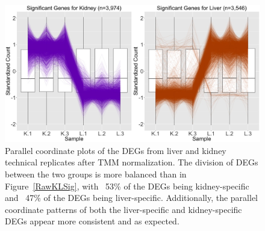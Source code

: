 \documentclass{article}
\begin{document}
\clearpage
\null
\begin{figure}[t!]
\centerline{\includegraphics[width=1\columnwidth]{../Bioinformatics/Pictures/liverKidney/Clustering_data_FDR_001_TMM/Alpha0.1/K_L_Sig.jpg}}
\caption{Parallel coordinate plots of the DEGs from liver and kidney technical replicates after TMM normalization. The division of DEGs between the two groups is more balanced than in Figure~\ref{RawKLSig}, with ~53\% of the DEGs being kidney-specific and ~47\% of the DEGs being liver-specific. Additionally, the parallel coordinate patterns of both the liver-specific and kidney-specific DEGs appear more consistent and as expected.
\label{TMMKLSig}}
\end{figure} 
\end{document}
